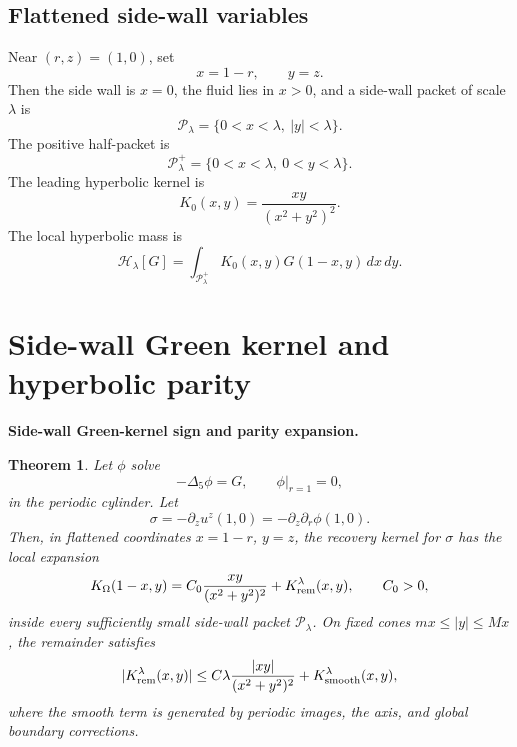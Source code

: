 \documentclass[11pt]{amsart}
\newtheorem{theorem}{Theorem}[section]
\begin{document}
\subsection{Flattened side-wall variables}

Near \((r,z)=(1,0)\), set
\begin{equation}\label{eq:flat_vars}
x=1-r,
\qquad
 y=z.
\end{equation}
Then the side wall is \(x=0\), the fluid lies in \(x>0\), and a side-wall packet of scale \(\lambda\) is
\begin{equation}\label{eq:P_lambda}
\mathcal P_\lambda=\{0<x<\lambda,
\ |y|<\lambda\}.
\end{equation}
The positive half-packet is
\begin{equation}\label{eq:P_lambda_plus}
\mathcal P_\lambda^+=\{0<x<\lambda,
\ 0<y<\lambda\}.
\end{equation}
The leading hyperbolic kernel is
\begin{equation}\label{eq:K0_def}
K_0(x,y)=\frac{xy}{(x^2+y^2)^2}.
\end{equation}
The local hyperbolic mass is
\begin{equation}\label{eq:Hlambda_def}
\mathcal H_\lambda[G]
=
\int_{\mathcal P_\lambda^+}
K_0(x,y)G(1-x,y)\,dx\,dy.
\end{equation}

\section{Side-wall Green kernel and hyperbolic parity}

\medskip
\noindent\textbf{Side-wall Green-kernel sign and parity expansion.}
\begin{theorem}\label{thm:green_kernel_expansion}
Let \(\phi\) solve
\[
-\Delta_5\phi=G,
\qquad
\phi|_{r=1}=0,
\]
in the periodic cylinder.  Let
\[
\sigma=-\partial_z u^z(1,0)=-\partial_z\partial_r\phi(1,0).
\]
Then, in flattened coordinates \(x=1-r\), \(y=z\), the recovery kernel for \(\sigma\) has the local expansion
\begin{equation}\label{eq:K_expansion}
K_\Omega(1-x,y)=C_0\frac{xy}{(x^2+y^2)^2}+K_{\rm rem}^{\lambda}(x,y),
\qquad C_0>0,
\end{equation}
inside every sufficiently small side-wall packet \(\mathcal P_\lambda\).  On fixed cones \(m x\le |y|\le Mx\), the remainder satisfies
\begin{equation}\label{eq:K_rem_bound}
|K_{\rm rem}^{\lambda}(x,y)|
\le
C\lambda\frac{|xy|}{(x^2+y^2)^2}
+
K_{\rm smooth}^{\lambda}(x,y),
\end{equation}
where the smooth term is generated by periodic images, the axis, and global boundary corrections.
\end{theorem}
\end{document}

